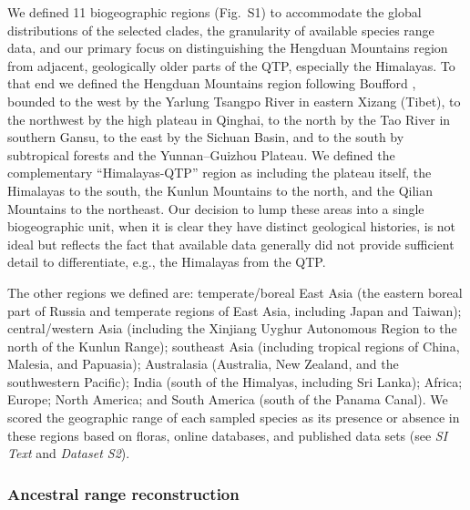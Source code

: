 We defined 11 biogeographic regions (Fig.~S1) to accommodate the
global distributions of the selected clades, the granularity of
available species range data, and our primary focus on distinguishing
the Hengduan Mountains region from adjacent, geologically older parts
of the QTP, especially the Himalayas. To that end we defined the
Hengduan Mountains region following Boufford \citep{Boufford2014},
bounded to the west by the Yarlung Tsangpo River in eastern Xizang
(Tibet), to the northwest by the high plateau in Qinghai, to the north
by the Tao River in southern Gansu, to the east by the Sichuan Basin,
and to the south by subtropical forests and the Yunnan–Guizhou
Plateau. We defined the complementary ``Himalayas-QTP'' region as
including the plateau itself, the Himalayas to the south, the Kunlun
Mountains to the north, and the Qilian Mountains to the northeast. Our
decision to lump these areas into a single biogeographic unit, when it
is clear they have distinct geological histories, is not ideal but
reflects the fact that available data generally did not provide
sufficient detail to differentiate, e.g., the Himalayas from the QTP.

The other regions we defined are: temperate/boreal East Asia (the
eastern boreal part of Russia and temperate regions of East Asia,
including Japan and Taiwan); central/western Asia (including the
Xinjiang Uyghur Autonomous Region to the north of the Kunlun Range);
southeast Asia (including tropical regions of China, Malesia, and
Papuasia); Australasia (Australia, New Zealand, and the southwestern
Pacific); India (south of the Himalyas, including Sri Lanka); Africa;
Europe; North America; and South America (south of the Panama
Canal). We scored the geographic range of each sampled species as its
presence or absence in these regions based on floras, online
databases, and published data sets (see \textit{SI Text} and
\textit{Dataset S2}).

\subsubsection*{Ancestral range reconstruction}

